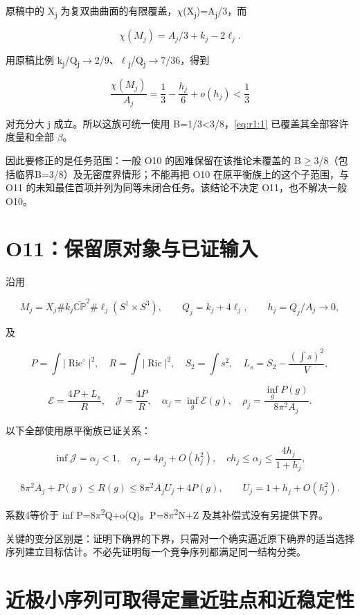 \documentclass[UTF8,11pt,fontset=none]{ctexart}
\begin{document}
原稿中的 X\textsubscript{j} 为复双曲曲面的有限覆盖，\(\chi\)(X\textsubscript{j})=A\textsubscript{j}/3，而

\[
\chi(M_j)=A_j/3+k_j-2\ell_j.
\]

用原稿比例 k\textsubscript{j}/Q\textsubscript{j}\(\to\)2/9、\(\ell\)\textsubscript{j}/Q\textsubscript{j}\(\to\)7/36，得到

\[
\frac{\chi(M_j)}{A_j}
=\frac13-\frac{h_j}{6}+o(h_j)<\frac13
\]

对充分大 j 成立。所以这族可统一使用 B=1/3\textless3/8，\eqref{eq:r1:1} 已覆盖其全部容许度量和全部 \(\beta\)。

因此要修正的是任务范围：一般 O10 的困难保留在该推论未覆盖的 B\(\ge\)3/8（包括临界B=3/8）及无密度界情形；不能再把 O10 在原平衡族上的这个子范围，与 O11 的未知最佳首项并列为同等未闭合任务。该结论不决定 O11，也不解决一般 O10。

\section{O11：保留原对象与已证输入}\label{ch1:o11ux4fddux7559ux539fux5bf9ux8c61ux4e0eux5df2ux8bc1ux8f93ux5165}

沿用

\[
M_j=X_j\#k_j\overline{\mathbb{CP}}^2
\#\ell_j(S^1\times S^3),\qquad
Q_j=k_j+4\ell_j,\qquad h_j=Q_j/A_j\to0,
\]

及

\[
P=\int|\operatorname{Ric}^{\circ}|^2,\quad
R=\int|\operatorname{Ric}|^2,\quad S_2=\int s^2,
\quad L_s=S_2-\frac{(\int s)^2}{V},
\]

\[
\mathcal E=\frac{4P+L_s}{R},\quad
\mathcal J=\frac{4P}{R},\quad
\alpha_j=\inf_g\mathcal E(g),\quad
\rho_j=\frac{\inf_gP(g)}{8\pi^2A_j}.
\]

以下全部使用原平衡族已证关系：

\[
\inf\mathcal J=\alpha_j<1,\quad
\alpha_j=4\rho_j+O(h_j^2),\quad
c h_j\le\alpha_j\le\frac{4h_j}{1+h_j},
\tag{1.5}\label{eq:r1:5}
\]

\[
8\pi^2A_j+P(g)\le R(g)\le8\pi^2A_jU_j+4P(g),
\qquad U_j=1+h_j+O(h_j^2).
\tag{1.6}\label{eq:r1:6}
\]

系数4等价于 inf P=8\(\pi\)\textsuperscript{2}Q+o(Q)。P=8\(\pi\)\textsuperscript{2}N+Z 及其补偿式没有另提供下界。

关键的变分区别是：证明下确界的下界，只需对一个确实逼近原下确界的适当选择序列建立目标估计。不必先证明每一个竞争序列都满足同一结构分类。

\section{近极小序列可取得定量近驻点和近稳定性}\label{ch1:ux8fd1ux6781ux5c0fux5e8fux5217ux53efux53d6ux5f97ux5b9aux91cfux8fd1ux9a7bux70b9ux548cux8fd1ux7a33ux5b9aux6027}
\end{document}
